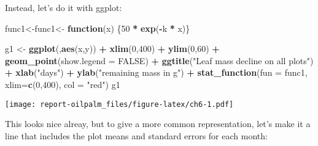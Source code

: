 \documentclass[
]{article}
\newenvironment{Shaded}{\begin{snugshade}}{\end{snugshade}}
\newcommand{\ControlFlowTok}[1]{\textcolor[rgb]{0.13,0.29,0.53}{\textbf{#1}}}
\newcommand{\DataTypeTok}[1]{\textcolor[rgb]{0.13,0.29,0.53}{#1}}
\newcommand{\DecValTok}[1]{\textcolor[rgb]{0.00,0.00,0.81}{#1}}
\newcommand{\KeywordTok}[1]{\textcolor[rgb]{0.13,0.29,0.53}{\textbf{#1}}}
\newcommand{\NormalTok}[1]{#1}
\newcommand{\OperatorTok}[1]{\textcolor[rgb]{0.81,0.36,0.00}{\textbf{#1}}}
\newcommand{\OtherTok}[1]{\textcolor[rgb]{0.56,0.35,0.01}{#1}}
\newcommand{\StringTok}[1]{\textcolor[rgb]{0.31,0.60,0.02}{#1}}
\begin{document}
Instead, let's do it with ggplot:

\begin{Shaded}
\begin{Highlighting}[]
\NormalTok{func1<-func1<-}\StringTok{ }\ControlFlowTok{function}\NormalTok{(x) \{}\DecValTok{50} \OperatorTok{*}\StringTok{ }\KeywordTok{exp}\NormalTok{(}\OperatorTok{-}\NormalTok{k }\OperatorTok{*}\StringTok{ }\NormalTok{x)\}}

\NormalTok{g1 <-}\StringTok{ }\KeywordTok{ggplot}\NormalTok{(,}\KeywordTok{aes}\NormalTok{(x,y)) }\OperatorTok{+}
\StringTok{  }\KeywordTok{xlim}\NormalTok{(}\DecValTok{0}\NormalTok{,}\DecValTok{400}\NormalTok{) }\OperatorTok{+}
\StringTok{  }\KeywordTok{ylim}\NormalTok{(}\DecValTok{0}\NormalTok{,}\DecValTok{60}\NormalTok{) }\OperatorTok{+}
\StringTok{  }\KeywordTok{geom_point}\NormalTok{(}\DataTypeTok{show.legend =} \OtherTok{FALSE}\NormalTok{) }\OperatorTok{+}
\StringTok{  }\KeywordTok{ggtitle}\NormalTok{(}\StringTok{"Leaf mass decline on all plots"}\NormalTok{) }\OperatorTok{+}
\StringTok{  }\KeywordTok{xlab}\NormalTok{(}\StringTok{"days"}\NormalTok{) }\OperatorTok{+}
\StringTok{  }\KeywordTok{ylab}\NormalTok{(}\StringTok{"remaining mass in g"}\NormalTok{) }\OperatorTok{+}
\StringTok{  }\KeywordTok{stat_function}\NormalTok{(}\DataTypeTok{fun =}\NormalTok{ func1, }\DataTypeTok{xlim=}\KeywordTok{c}\NormalTok{(}\DecValTok{0}\NormalTok{,}\DecValTok{400}\NormalTok{), }\DataTypeTok{col =} \StringTok{"red"}\NormalTok{) }
\NormalTok{g1}
\end{Highlighting}
\end{Shaded}

\texttt{[image: report-oilpalm\_files/figure-latex/ch6-1.pdf]}

This looks nice alreay, but to give a more common representation, let's
make it a line that includes the plot means and standard errors for each
month:

\begin{Shaded}
\end{Shaded}
\end{document}
